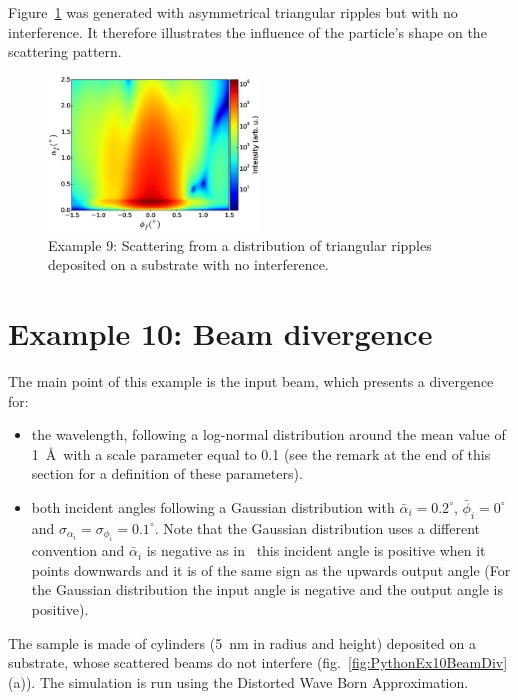 Figure~\ref{fig:PythonEx9TriRipplenointerf} was generated with asymmetrical triangular ripples but with no interference. It therefore illustrates the influence of the particle's shape on the scattering pattern.

\begin{figure}[H]
\begin{center}
\includegraphics[width=0.5\textwidth]{Figures/figure_ex009TriRippleNoInterf.eps}
\end{center}
\caption{Example 9: Scattering from a distribution of triangular ripples deposited on a substrate with no interference.}
\label{fig:PythonEx9TriRipplenointerf}
\end{figure}

\newpage
\section{Example 10: Beam divergence}
The main point of this example is the input beam, which presents a divergence for:
\begin{itemize}
\item the wavelength, following a log-normal distribution around the mean value of 1~\AA\ with a scale parameter equal to 0.1 (see the remark at the end of this section for a definition of these parameters).
\item  both incident angles following a Gaussian distribution with 
$\bar \alpha_i=0.2^{\circ}$, $\bar\phi_i=0^{\circ}$ and $\sigma_{\alpha_i}=\sigma_{\phi_i}=0.1^{\circ}$. Note that the Gaussian distribution uses a different convention  and  $\bar \alpha_i$ is negative as in \BornAgain\ this incident angle is positive when it points downwards and it is of the same sign as the upwards output angle (For the Gaussian distribution the input angle is negative and the output angle is positive).
\end{itemize}
The sample is made of cylinders (5~nm in radius and height) deposited on a substrate, whose scattered beams do not interfere (fig.~\ref{fig:PythonEx10BeamDiv}(a)). The simulation is run using the Distorted Wave Born Approximation.

